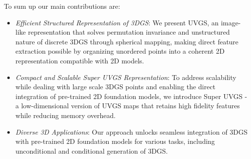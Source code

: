 %
To sum up our main contributions are:
%
\begin{itemize}
    \item \emph{Efficient Structured Representation of 3DGS}: We present UVGS, an image-like representation that solves permutation invariance and unstructured nature of discrete 3DGS through spherical mapping, making direct feature extraction possible by organizing unordered points into a coherent 2D representation compatible with 2D models.
    \item \emph{Compact and Scalable Super UVGS Representation}: To address scalability while dealing with large scale 3DGS points and enabling the direct integration of pre-trained 2D foundation models, we introduce Super UVGS - a low-dimensional version of UVGS maps that retains high fidelity features while reducing memory overhead. 
    \item \emph{Diverse 3D Applications}: Our approach unlocks seamless integration of 3DGS with pre-trained 2D foundation models for various tasks, including unconditional and conditional generation of 3DGS. 
%
\end{itemize}

